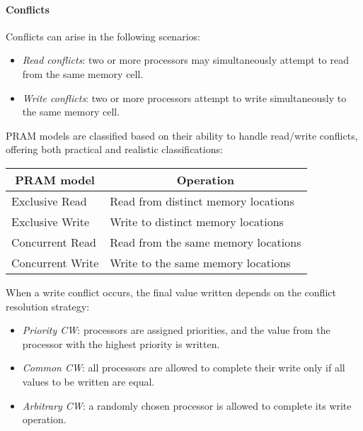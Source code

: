 \paragraph*{Conflicts}
Conflicts can arise in the following scenarios:
\begin{itemize}
    \item \textit{Read conflicts}: two or more processors may simultaneously attempt to read from the same memory cell.
    \item \textit{Write conflicts}: two or more processors attempt to write simultaneously to the same memory cell.
\end{itemize}
PRAM models are classified based on their ability to handle read/write conflicts, offering both practical and realistic classifications:
\renewcommand*{\arraystretch}{2}
\begin{table}[H]
    \centering
    \begin{tabular}{|l|l|}
    \hline
    \multicolumn{1}{|c|}{\textbf{PRAM model}} & \multicolumn{1}{c|}{\textbf{Operation}} \\ \hline
    Exclusive Read                            & Read from distinct memory locations     \\
    Exclusive Write                           & Write to distinct memory locations      \\
    Concurrent Read                           & Read from the same memory locations     \\
    Concurrent Write                          & Write to the same memory locations      \\ \hline
    \end{tabular}
\end{table}
\renewcommand*{\arraystretch}{1}
When a write conflict occurs, the final value written depends on the conflict resolution strategy:
\begin{itemize}
    \item \textit{Priority CW}: processors are assigned priorities, and the value from the processor with the highest priority is written.
    \item \textit{Common CW}: all processors are allowed to complete their write only if all values to be written are equal.
    \item \textit{Arbitrary CW}: a randomly chosen processor is allowed to complete its write operation.
\end{itemize}

